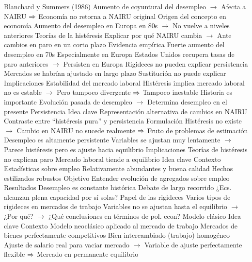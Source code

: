\documentclass{nuevotema}
\begin{document}
\begin{esquemal}
				\4[] Blanchard y Summers (1986)
				\4[] Aumento de coyuntural del desempleo
				\4[] $\to$ Afecta a NAIRU
				\4[] $\Rightarrow$ Economía no retorna a NAIRU original
				\4 Origen del concepto en economía
				\4[] Aumento del desempleo en Europa en 80s
				\4[] $\to$ No vuelve a niveles anteriores
				\4 Teorías de la histéresis
				\4[] Explicar por qué NAIRU cambia
				\4[] $\to$ Ante cambios en paro en un corto plazo
			\3 Evidencia empírica
				\4 Fuerte aumento del desempleo en 70s
				\4[] Especialmente en Europa
				\4[] Estados Unidos recupera tasas de paro anteriores
				\4[] $\to$ Persisten en Europa
				\4 Rigideces no pueden explicar persistencia
				\4[] Mercados se habrían ajustado en largo plazo
				\4 Sustitución no puede explicar
			\3 Implicaciones
				\4 Estabilidad del mercado laboral
				\4[] Histéresis implica mercado laboral no es estable
				\4[] $\to$ Pero tampoco divergente
				\4[] $\Rightarrow$ Tampoco inestable
				\4 Historia es importante
				\4[] Evolución pasada de desempleo
				\4[] $\to$ Determina desempleo en el presente
		\2 Persistencia
			\3 Idea clave
				\4 Representación alternativa de cambios en NAIRU
				\4 Contraste entre ``histéresis pura'' y persistencia
			\3 Formulación
				\4 Histéresis no existe
				\4[] $\to$ Cambio en NAIRU no sucede realmente
				\4[] $\Rightarrow$ Fruto de problemas de estimación
				\4 Desempleo es altamente persistente
				\4[] Variables se ajustan muy lentamente
				\4[] $\to$ Parece histéresis pero es ajuste hacia equilibrio
			\3 Implicaciones
				\4 Teorías de histéresis no explican paro
				\4 Mercado laboral tiende a equilibrio
	\1 
		\2 Idea clave
			\3 Contexto
				\4 Estadísticas sobre empleo
				\4[] Relativamente abundantes y buena calidad
				\4 Hechos estilizados robustos
			\3 Objetivo
				\4 Entender evolución de agregados sobre empleo
			\3 Resultados
				\4 Desempleo es constante histórica
				\4 Debate de largo recorrido
				\4[] ¿Ecs. alcanzan plena capacidad por sí solas?
				\4 Papel de las rigideces
				\4[] Varios tipos de rigideces en mercados de trabajo
				\4[] Variables no se ajustan hasta el equilibrio
				\4[] $\to$ ¿Por qué?
				\4[] $\to$ ¿Qué conclusiones en términos de pol. econ?
		\2 Modelo clásico
			\3 Idea clave
				\4 Contexto
				\4[] Modelo neoclásico aplicado al mercado de trabajo
				\4[] Mercados de bienes perfectamente competitivos
				\4[] Bien intercambiado (trabajo) homogéneo
				\4[] Ajuste de salario real para vaciar mercado
				\4[] $\to$ Variable de ajuste perfectamente flexible
				\4[] $\Rightarrow$ Mercado en permanente equilibrio

\end{esquemal}
\end{document}
